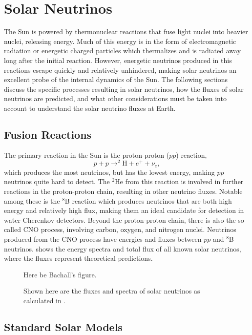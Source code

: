 \section{Solar Neutrinos}

The Sun is powered by thermonuclear reactions that fuse light nuclei into heavier nuclei, releasing energy.
Much of this energy is in the form of electromagnetic radiation or energetic charged particles which thermalizes and is radiated away long after the initial reaction.
However, energetic neutrinos produced in this reactions escape quickly and relatively unhindered, making solar neutrinos an excellent probe of the internal dynamics of the Sun.
The following sections discuss the specific processes resulting in solar neutrinos, how the fluxes of solar neutrinos are predicted, and what other considerations must be taken into account to understand the solar neutrino fluxes at Earth.

\subsection{Fusion Reactions}

The primary reaction in the Sun is the proton-proton ($pp$) reaction,
\begin{equation}
p+p \rightarrow ^2\mathrm{H}+e^++\nu_e,
\end{equation}
which produces the most neutrinos, but has the lowest energy, making $pp$ neutrinos quite hard to detect.
The $^2$He from this reaction is involved in further reactions in the proton-proton chain, resulting in other neutrino fluxes.
Notable among these is the $^8$B reaction which produces neutrinos that are both high energy and relatively high flux, making them an ideal candidate for detection in water Cherenkov detectors.
Beyond the proton-proton chain, there is also the so called CNO process, involving carbon, oxygen, and nitrogen nuclei. 
Neutrinos produced from the CNO process have energies and fluxes between $pp$ and $^8$B neutrinos.
 shows the energy spectra and total flux of all known solar neutrinos, where the fluxes represent theoretical predictions.

\begin{figure}
\centering
Here be Bachall's figure.
\caption{\label{neutrino_spectra}Shown here are the fluxes and spectra of solar neutrinos as calculated in \cite{bs05op}.}
\end{figure}

\subsection{Standard Solar Models}


